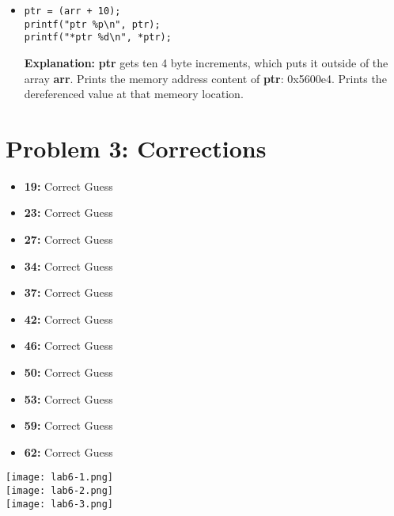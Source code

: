 \documentclass{article}
\begin{document}
\begin{itemize}
\begin{lstlisting}
ptr = arr; // reset ptr, no need to explain this statement

arr[2] = *(ptr + 5);
printf("arr[2] = %d\n", arr[2]);

\end{lstlisting}
\textbf{Explanation:} \textbf{arr[2]} gets the dereferenced value of \textbf{ptr + 5}, which is \textbf{arr[5]}. Prints the value of \textbf{arr[2]}: 1200.
\item \begin{lstlisting}
ptr = (arr + 10);
printf("ptr %p\n", ptr);
printf("*ptr %d\n", *ptr);
\end{lstlisting}
\textbf{Explanation:} \textbf{ptr} gets ten 4 byte increments, which puts it outside of the array \textbf{arr}. Prints the memory address content of \textbf{ptr}: 0x5600e4. Prints the dereferenced value at that memeory location.
\end{itemize}
\section*{Problem 3: Corrections}
\begin{itemize}
  \item \textbf{19:} Correct Guess
  \item \textbf{23:} Correct Guess
  \item \textbf{27:} Correct Guess
  \item \textbf{34:} Correct Guess
  \item \textbf{37:} Correct Guess
  \item \textbf{42:} Correct Guess
  \item \textbf{46:} Correct Guess
  \item \textbf{50:} Correct Guess
  \item \textbf{53:} Correct Guess
  \item \textbf{59:} Correct Guess
  \item \textbf{62:} Correct Guess
\end{itemize}
\pagebreak
\texttt{[image: lab6-1.png]}\\
\texttt{[image: lab6-2.png]}\\
\texttt{[image: lab6-3.png]}
\pagebreak
\end{document}

